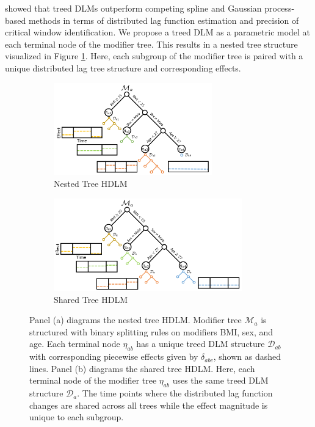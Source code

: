 \documentclass[12pt]{article}
\begin{document}
\cite{Mork2022EstimatingPairs} showed that treed DLMs outperform competing spline and Gaussian process-based methods in terms of distributed lag function estimation and precision of critical window identification. We propose a treed DLM as a parametric model at each terminal node of the modifier tree. This results in a nested tree structure visualized in Figure \ref{fig:nested_hdlm}. Here, each subgroup of the modifier tree is paired with a unique distributed lag tree structure and corresponding effects.

\begin{figure}
    \centering
    \begin{subfigure}[b]{.44\textwidth}
    \includegraphics[height=4cm]{img/nested_tree_diagram.PNG}
    \caption{Nested Tree HDLM}
    \label{fig:nested_hdlm}
    \end{subfigure}
    \begin{subfigure}[b]{.54\textwidth}
    \includegraphics[height=4cm]{img/shared_tree_diagram.PNG}
    \caption{Shared Tree HDLM}
    \label{fig:shared_hdlm}
    \end{subfigure}
    \caption{Panel (a) diagrams the nested tree HDLM. Modifier tree $\mathcal{M}_a$ is structured with binary splitting rules on modifiers BMI, sex, and age. Each terminal node $\eta_{ab}$ has a unique treed DLM structure $\mathcal{D}_{ab}$ with corresponding piecewise effects given by $\delta_{abc}$, shown as dashed lines. Panel (b) diagrams the shared tree HDLM. Here, each terminal node of the modifier tree $\eta_{ab}$ uses the same treed DLM structure $\mathcal{D}_a$. The time points where the distributed lag function changes are shared across all trees while the effect magnitude is unique to each subgroup.}
\end{figure}
\end{document}
